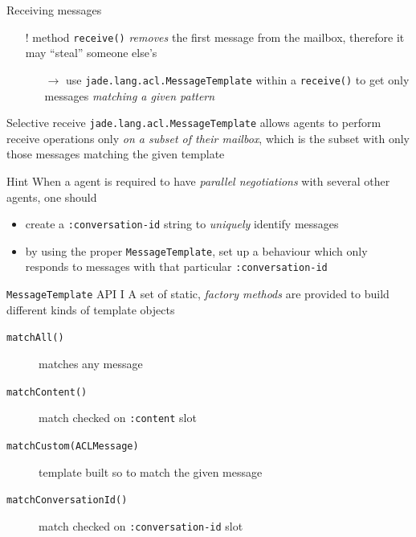 \documentclass{beamer}\mode<presentation>{\usetheme{AMSCesenaPurpleAndGold}}
\begin{document}
\begin{frame}[c,allowframebreaks]
\begin{block}{Receiving messages}
\begin{itemize}
\begin{itemize}
            \end{itemize}
            \item[!] method \texttt{receive()} \emph{removes} the first message from the mailbox, therefore it may ``steal'' someone else's
            \begin{itemize}
                \item[$\rightarrow$] use \alert{\texttt{jade.lang.acl.MessageTemplate}} within a \texttt{receive()} to get only messages \emph{matching a given pattern}
            \end{itemize}
        \end{itemize}
    \end{block}
    \begin{block}{Selective receive}
        \texttt{jade.lang.acl.MessageTemplate} allows \jade{} agents to perform receive operations only \emph{on a subset of their mailbox}, which is the subset with only those messages \alert{matching} the given template
    \end{block}
    \begin{block}{Hint}
        When a \jade{} agent is required to have \emph{parallel negotiations} with several other agents, one should
        \begin{itemize}
            \item create a \texttt{:conversation-id} string to \emph{uniquely} identify messages
            \item by using the proper \texttt{MessageTemplate}, set up a behaviour which only responds to messages with that particular \texttt{:conversation-id}
        \end{itemize}
    \end{block}
    \begin{block}{\texttt{MessageTemplate} API I}
        A set of static, \emph{factory methods} are provided to build different kinds of template objects
        \begin{description}
            \item[\texttt{matchAll()}] matches any \acl{} message
            \item[\texttt{matchContent()}] match checked on \texttt{:content} slot
            \item[\texttt{matchCustom(ACLMessage)}] template built so to match the given \acl{} message
            \item[\texttt{matchConversationId()}] match checked on \texttt{:conversation-id} slot

\end{description}
\end{block}
\end{frame}
\end{document}
